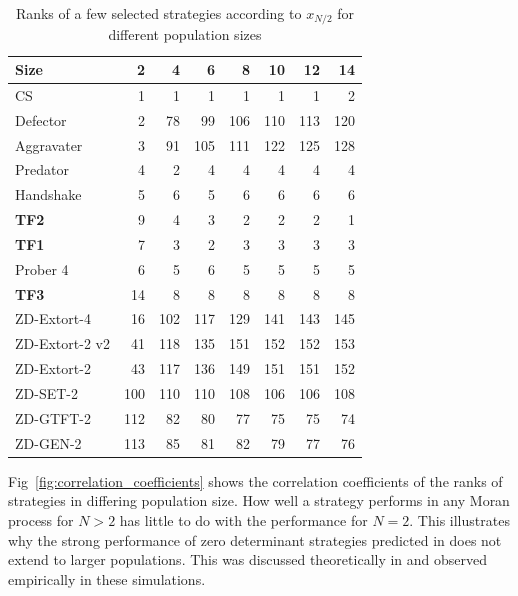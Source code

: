 \documentclass[10pt,letterpaper]{article}
\begin{document}
\begin{table}[!hbtp]
    \centering
    \scriptsize
        \begin{tabular}{lrrrrrrr}
        \toprule
                   Size &      2 &      4 &      6 &      8 &     10 &     12 &     14 \\
        \midrule
                     CS &    1 &    1 &    1 &    1 &    1 &    1 &    2 \\
               Defector &    2 &   78 &   99 &  106 &  110 &  113 &  120 \\
             Aggravater &    3 &   91 &  105 &  111 &  122 &  125 &  128 \\
               Predator &    4 &    2 &    4 &    4 &    4 &    4 &    4 \\
              Handshake &    5 &    6 &    5 &    6 &    6 &    6 &    6 \\
        \midrule
                    \textbf{TF2} &    9 &    4 &    3 &    2 &    2 &    2 &    1 \\
                    \textbf{TF1} &    7 &    3 &    2 &    3 &    3 &    3 &    3 \\
               Prober 4 &    6 &    5 &    6 &    5 &    5 &    5 &    5 \\
        \midrule
                    \textbf{TF3} &   14 &    8 &    8 &    8 &    8 &    8 &    8 \\
        \midrule
            ZD-Extort-4 &   16 &  102 &  117 &  129 &  141 &  143 &  145 \\
         ZD-Extort-2 v2 &   41 &  118 &  135 &  151 &  152 &  152 &  153 \\
            ZD-Extort-2 &   43 &  117 &  136 &  149 &  151 &  151 &  152 \\
               ZD-SET-2 &  100 &  110 &  110 &  108 &  106 &  106 &  108 \\
              ZD-GTFT-2 &  112 &   82 &   80 &   77 &   75 &   75 &   74 \\
               ZD-GEN-2 &  113 &   85 &   81 &   82 &   79 &   77 &   76 \\
        \bottomrule
        \end{tabular}
    \caption{Ranks of a few selected strategies according to \(x_{N/2}\) for different
    population sizes}
    \label{tbl:ranks_v_size_coexist}
\end{table}


Fig~\ref{fig:correlation_coefficients} shows the correlation coefficients
of the ranks of strategies in differing population size. How well a strategy
performs in any Moran process for \(N>2\) has
little to do with the performance for \(N=2\). This illustrates why the strong
performance of zero determinant strategies predicted in \cite{Press2012} does
not extend to larger populations. This was discussed theoretically in
\cite{Adami2013} and observed empirically in these simulations.
\end{document}

